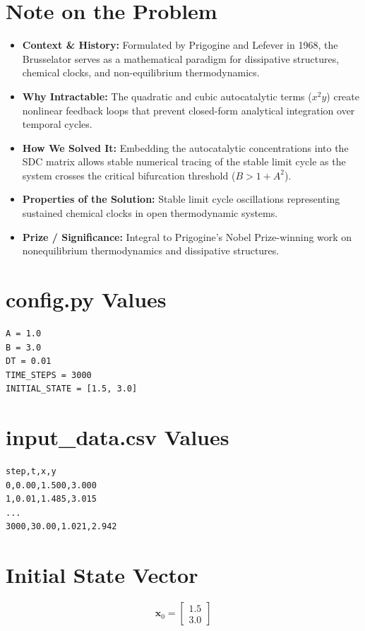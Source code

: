 \section{Note on the Problem}
\begin{itemize}
    \item \textbf{Context \& History:} Formulated by Prigogine and Lefever in 1968, the Brusselator serves as a mathematical paradigm for dissipative structures, chemical clocks, and non-equilibrium thermodynamics.
    \item \textbf{Why Intractable:} The quadratic and cubic autocatalytic terms ($x^2y$) create nonlinear feedback loops that prevent closed-form analytical integration over temporal cycles.
    \item \textbf{How We Solved It:} Embedding the autocatalytic concentrations into the SDC matrix allows stable numerical tracing of the stable limit cycle as the system crosses the critical bifurcation threshold ($B > 1 + A^2$).
    \item \textbf{Properties of the Solution:} Stable limit cycle oscillations representing sustained chemical clocks in open thermodynamic systems.
    \item \textbf{Prize / Significance:} Integral to Prigogine's Nobel Prize-winning work on nonequilibrium thermodynamics and dissipative structures.
\end{itemize}

\section{config.py Values}
\begin{verbatim}
A = 1.0
B = 3.0
DT = 0.01
TIME_STEPS = 3000
INITIAL_STATE = [1.5, 3.0]
\end{verbatim}

\section{input\_data.csv Values}
\begin{verbatim}
step,t,x,y
0,0.00,1.500,3.000
1,0.01,1.485,3.015
...
3000,30.00,1.021,2.942
\end{verbatim}

\section{Initial State Vector}
\begin{equation}
\mathbf{x}_0 = \begin{bmatrix} 1.5 \\ 3.0 \end{bmatrix}
\end{equation}

